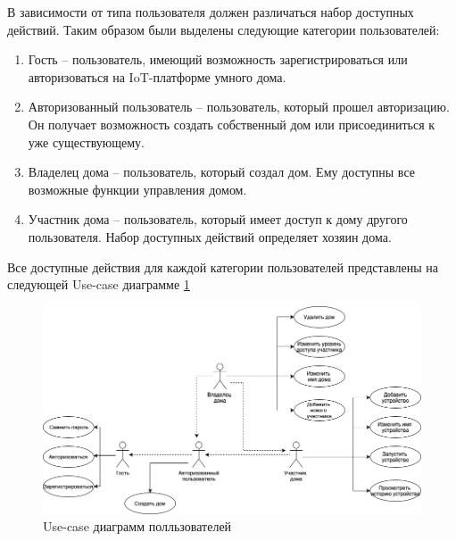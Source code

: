В зависимости от типа пользователя должен различаться набор доступных действий. Таким 
образом были выделены следующие категории пользователей:

\begin{enumerate}
    \item Гость -- пользователь, имеющий возможность 
    зарегистрироваться или авторизоваться на IoT-платформе умного дома.
    \item Авторизованный пользователь -- пользователь, который прошел авторизацию. 
    Он получает возможность создать собственный дом или присоединиться к уже существующему.
    \item Владелец дома -- пользователь, который создал дом. Ему доступны все возможные функции управления домом.
    \item Участник дома -- пользователь, который имеет доступ к дому другого пользователя. 
    Набор доступных действий определяет хозяин дома.
\end{enumerate}

Все доступные действия для каждой категории пользователей представлены на следующей Use-case диаграмме \ref{img:iot}
\begin{figure}[h]
    \includegraphics[width=0.9\linewidth]{img/ucd.png}
    \caption{Use-case диаграмм полльзователей}
    \label{img:iot}
\end{figure}
\clearpage

